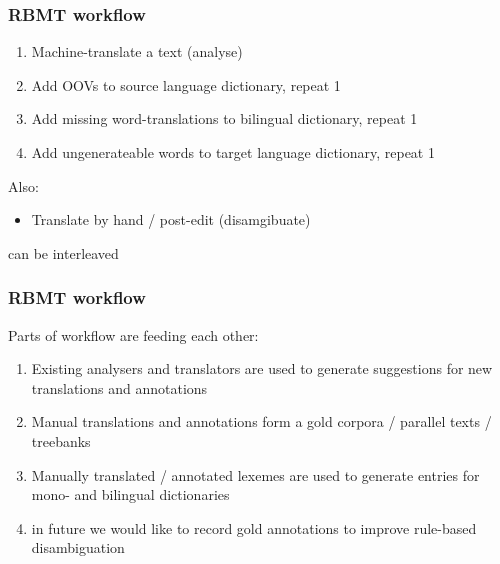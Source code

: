 \documentclass{beamer}
\begin{document}
\begin{frame}
    \frametitle{RBMT workflow}
    \begin{enumerate}
        \item Machine-translate a text (analyse)
        \item Add OOVs to source language dictionary, repeat 1
        \item Add missing word-translations to bilingual dictionary, repeat 1
        \item Add ungenerateable words to target language dictionary, repeat 1
    \end{enumerate}
    Also:
    \begin{itemize}
        \item Translate by hand / post-edit (disamgibuate)
    \end{itemize}
    can be interleaved
\end{frame}

\begin{frame}
    \frametitle{RBMT workflow}
    Parts of workflow are feeding each other:
    \begin{enumerate}
        \item Existing analysers and translators are used to generate
            suggestions for new translations and annotations
        \item Manual translations and annotations form a gold corpora / parallel
            texts / treebanks
        \item Manually translated / annotated lexemes are used to
            generate entries for mono- and bilingual dictionaries
        \item in future we would like to record gold annotations to improve
            rule-based disambiguation
    \end{enumerate}
\end{frame}
\end{document}
